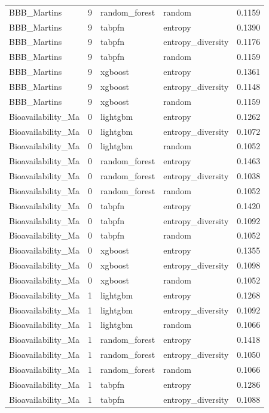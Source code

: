 \begin{tabular}{lrllr}
BBB_Martins & 9 & random_forest & random & 0.1159 \\
BBB_Martins & 9 & tabpfn & entropy & 0.1390 \\
BBB_Martins & 9 & tabpfn & entropy_diversity & 0.1176 \\
BBB_Martins & 9 & tabpfn & random & 0.1159 \\
BBB_Martins & 9 & xgboost & entropy & 0.1361 \\
BBB_Martins & 9 & xgboost & entropy_diversity & 0.1148 \\
BBB_Martins & 9 & xgboost & random & 0.1159 \\
Bioavailability_Ma & 0 & lightgbm & entropy & 0.1262 \\
Bioavailability_Ma & 0 & lightgbm & entropy_diversity & 0.1072 \\
Bioavailability_Ma & 0 & lightgbm & random & 0.1052 \\
Bioavailability_Ma & 0 & random_forest & entropy & 0.1463 \\
Bioavailability_Ma & 0 & random_forest & entropy_diversity & 0.1038 \\
Bioavailability_Ma & 0 & random_forest & random & 0.1052 \\
Bioavailability_Ma & 0 & tabpfn & entropy & 0.1420 \\
Bioavailability_Ma & 0 & tabpfn & entropy_diversity & 0.1092 \\
Bioavailability_Ma & 0 & tabpfn & random & 0.1052 \\
Bioavailability_Ma & 0 & xgboost & entropy & 0.1355 \\
Bioavailability_Ma & 0 & xgboost & entropy_diversity & 0.1098 \\
Bioavailability_Ma & 0 & xgboost & random & 0.1052 \\
Bioavailability_Ma & 1 & lightgbm & entropy & 0.1268 \\
Bioavailability_Ma & 1 & lightgbm & entropy_diversity & 0.1092 \\
Bioavailability_Ma & 1 & lightgbm & random & 0.1066 \\
Bioavailability_Ma & 1 & random_forest & entropy & 0.1418 \\
Bioavailability_Ma & 1 & random_forest & entropy_diversity & 0.1050 \\
Bioavailability_Ma & 1 & random_forest & random & 0.1066 \\
Bioavailability_Ma & 1 & tabpfn & entropy & 0.1286 \\
Bioavailability_Ma & 1 & tabpfn & entropy_diversity & 0.1088 \\

\end{tabular}

